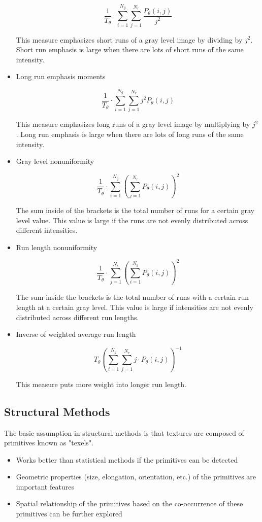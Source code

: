 \documentclass{article}
\begin{document}
\begin{multicols}{2}
\begin{itemize}
$$  
\frac{1}{T_\theta} \cdot \sum_{i=1} ^{N_g} \sum_{j=1} ^{N_r} \frac{P_\theta (i,j)}{j^2}
$$

This measure emphasizes short runs of a gray level image by dividing by $j^2$. Short run emphasis is large when there are lots of short runs of the same intensity.

\item {Long run emphasis moments}
  
$$
\frac{1}{T_\theta} \cdot \sum_{i=1} ^{N_g} \sum_{j=1} ^{N_r} j^2 P_\theta (i,j)
$$

This measure emphasizes long runs of a gray level image by multiplying by $j^2$. Long run emphasis is large when there are lots of long runs of the same intensity.

\item {Gray level nonuniformity}
  
$$
\frac{1}{T_\theta} \cdot \sum_{i=1} ^{N_g} \left(\sum_{j=1} ^{N_r} P_\theta (i,j)\right)^2
$$

The sum inside of the brackets is the total number of runs for a certain gray level value. This value is large if the runs are not evenly distributed across different intensities.

\item {Run length nonuniformity}
  
$$
\frac{1}{T_\theta} \cdot \sum_{j=1} ^{N_r} \left(\sum_{i=1} ^{N_g} P_\theta (i,j)\right)^2
$$

The sum inside the brackets is the total number of runs with a certain run length at a certain gray level. This value is large if intensities are not evenly distributed across different run lengths.

\item {Inverse of weighted average run length}
  
$$
T_\theta\left(\sum_{i=1}^{N_g} \sum_{j=1} ^{N_r} j \cdot P_\theta (i,j)\right)^{-1}
$$

This measure puts more weight into longer run length.

\end{itemize}

\subsection{Structural Methods}

The basic assumption in structural methods is that textures are composed of primitives known as "texels".

\begin{itemize}
  \item {Works better than statistical methods if the primitives can be detected}
  \item {Geometric properties (size, elongation, orientation, etc.) of the primitives are important features}
  \item {Spatial relationship of the primitives based on the co-occurrence of these primitives can be further explored}
\end{itemize}


\end{multicols}
\end{document}
